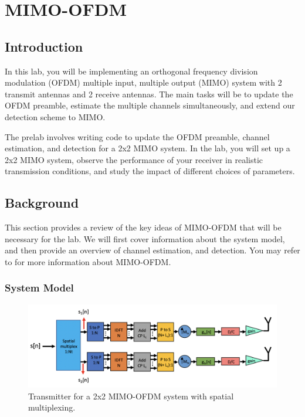\documentclass{book}
\begin{document}
\fancyhead[RE]{\helv  \bfseries \booktitle{}}
\setcounter{chapter}{10}
\chapter{\MIMOOFDM{} MIMO-OFDM}

\sloppy %

\section{Introduction}

In this lab, you will be implementing an orthogonal frequency division modulation (OFDM) multiple input, multiple output (MIMO) system with 2 transmit antennas and 2 receive antennas. The main tasks will be to update the OFDM preamble, estimate the multiple channels simultaneously, and extend our detection scheme to MIMO. 

The prelab involves writing code to update the OFDM preamble, channel estimation, and detection for a 2x2 MIMO system. In the lab, you will set up a 2x2 MIMO system, observe the performance of your receiver in realistic transmission conditions, and study the impact of different choices of parameters.


\section{Background}

This section provides a review of the key ideas of MIMO-OFDM that will be necessary for the lab. We will first cover information about the  system model, and then provide an overview of channel estimation, and detection. You may refer to   \cite[Chapter 6, Section 5]{Hea:Introduction-to-Wireless-Digital:17} for more information about MIMO-OFDM.

\subsection{System Model}
\begin{figure}
\begin{center}
\includegraphics[width=\columnwidth]{lab11/figure2.png}
\caption{Transmitter for a 2x2 MIMO-OFDM system with spatial multiplexing.} \label{transmit}
\end{center} 
\end{figure}
\end{document}
